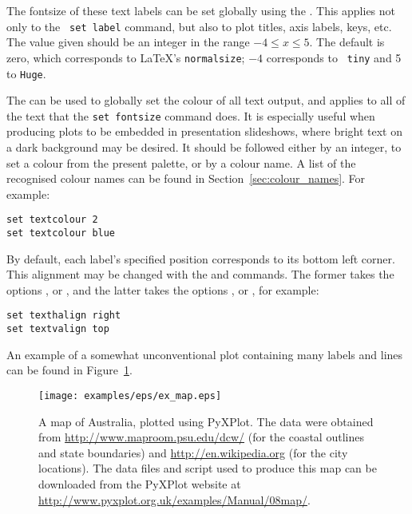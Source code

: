  The fontsize of these text labels can be set
globally using the . This applies not only to the {\tt
set label} command, but also to plot titles, axis labels, keys, etc. The value
given should be an integer in the range $-4 \leq x \leq 5$. The default is
zero, which corresponds to \LaTeX's {\tt normalsize}; $-4$ corresponds to {\tt
tiny} and 5 to {\tt Huge}.

 The  can be
used to globally set the colour of all text output, and applies to all of the
text that the {\tt set fontsize} command does. It is especially useful when
producing plots to be embedded in presentation slideshows, where bright text on
a dark background may be desired. It should be followed either by an integer,
to set a colour from the present palette, or by a colour name. A list of the
recognised colour names can be found in Section~\ref{sec:colour_names}.  For
example:

\begin{verbatim}
set textcolour 2
set textcolour blue
\end{verbatim}

By default, each label's specified
position corresponds to its bottom left corner. This alignment may be changed
with the  and  commands. The
former takes the options ,  or ,
and the latter takes the options ,  or
, for example:

\begin{verbatim}
set texthalign right
set textvalign top
\end{verbatim}

An example of a somewhat unconventional plot containing many labels and lines
can be found in Figure~\ref{fig:ex_map}.

\begin{figure}
\begin{center}
\texttt{[image: examples/eps/ex\_map.eps]}
\end{center}
\caption[A map of Australia, plotted using PyXPlot]
{A map of Australia, plotted using PyXPlot.  The data were obtained
from \protect\url{http://www.maproom.psu.edu/dcw/} (for the coastal outlines
and state boundaries) and \protect\url{http://en.wikipedia.org} (for the city
locations).  The data files and script used to produce this map can be
downloaded from the PyXPlot website at
\protect\url{http://www.pyxplot.org.uk/examples/Manual/08map/}.}
\label{fig:ex_map}
\end{figure}

